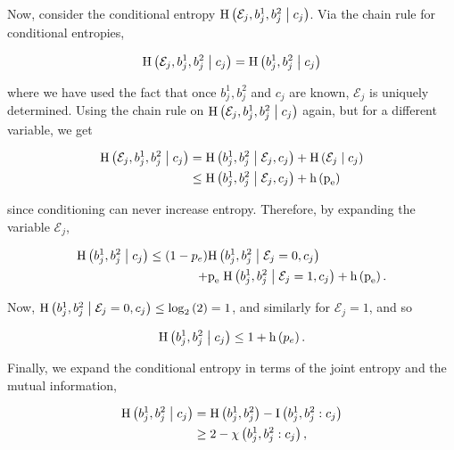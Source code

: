 Now, consider the conditional entropy $\text{H}\left(\mathcal{E}_j, b_j^1, b_j^2 \; \middle| \; c_j\right)$. Via the chain rule for conditional entropies,

\begin{equation*}
\text{H}\left(\mathcal{E}_j, b_j^1, b_j^2 \; \middle| \; c_j\right) = \text{H}\left(b_j^1, b_j^2 \; \middle| \; c_j\right)
\end{equation*}

\noindent where we have used the fact that once $b_j^1, b_j^2$ and $c_j$ are known, $\mathcal{E}_j$ is uniquely determined. Using the chain rule on $\text{H}\left(\mathcal{E}_j, b_j^1, b_j^2 \; \middle| \; c_j\right)$ again, but for a different variable, we get

\begin{align*}
\text{H}\left(\mathcal{E}_j, b_j^1, b_j^2 \; \middle| \; c_j\right) &= \text{H}\left(b_j^1, b_j^2 \; \middle| \; \mathcal{E}_j, c_j\right) + \text{H}\left(\mathcal{E}_j \; \middle| \; c_j\right) \notag \\
&\le \text{H}\left(b_j^1, b_j^2 \; \middle| \; \mathcal{E}_j, c_j\right) + \text{h}\left(\text{p}_{\text{e}}\right)
\end{align*}

\noindent since conditioning can never increase entropy. Therefore, by expanding the variable $\mathcal{E}_j$,

\begin{align*}
\text{H}\left(b_j^1, b_j^2 \; \middle| \; c_j\right) \le \left(1 - p_e\right) &\text{H}\left(b_j^1, b_j^2 \; \middle| \; \mathcal{E}_j = 0, c_j\right) \\ + &\text{p}_{\text{e}} \; \text{H}\left(b_j^1, b_j^2 \; \middle| \; \mathcal{E}_j=1, c_j\right) + \text{h}\left(\text{p}_{\text{e}}\right).
\end{align*}

\noindent Now, $\text{H}\left(b_j^1, b_j^2 \; \middle| \; \mathcal{E}_j=0, c_j\right) \le \log_2\left(2\right) = 1$, and similarly for $\mathcal{E}_j=1$, and so

\begin{equation}\label{eqn:A7}
\text{H}\left(b_j^1, b_j^2 \; \middle| \; c_j\right) \le 1 + \text{h}\left(p_e\right).
\end{equation}

\noindent Finally, we expand the conditional entropy in terms of the joint entropy and the mutual information,

\begin{align}\label{eqn:A8}
\text{H}\left(b_j^1, b_j^2 \; \middle| \; c_j\right) &= \text{H}\left(b_j^1, b_j^2\right) - \text{I}\left(b_j^1, b_j^2 : c_j\right) \notag \\
&\ge 2 - \chi\left(b_j^1, b_j^2 : c_j\right),
\end{align}

